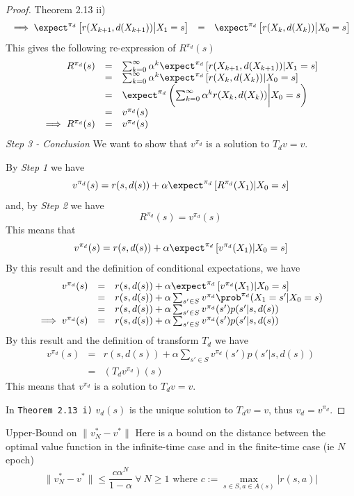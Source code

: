 \documentclass[11pt,a4paper]{article}
\begin{document}
\begin{proof}{Theorem 2.13 ii)}
\[\begin{array}{rcl}
      \implies\expect^{\pi_d}\left[r(X_{k+1},d(X_{k+1}))\big|X_1=s\right]&=&\expect^{\pi_d}\left[r(X_k,d(X_k))\big|X_0=s\right]
    \end{array}\]
    This gives the following re-expression of $R^{\pi_d}(s)$
    \[\begin{array}{rcl}
      R^{\pi_d}(s)&=&\sum_{k=0}^\infty\alpha^k\expect^{\pi_d}\left[r(X_{k+1},d(X_{k+1}))|X_1=s\right]\\
      &=&\sum_{k=0}^\infty\alpha^k\expect^{\pi_d}\left[r(X_k,d(X_k))|X_0=s\right]\\
      &=&\expect^{\pi_d}\left(\sum_{k=0}^\infty\alpha^kr(X_k,d(X_k))\bigg|X_0=s\right)\\
      &=&v^{\pi_d}(s)\\
      \implies R^{\pi_d}(s)&=&v^{\pi_d}(s)
    \end{array}\]
    \textit{Step 3 - Conclusion}
    We want to show that $v^{\pi_d}$ is a solution to $T_dv=v$.
    \par By \textit{Step 1} we have
    \[ v^{\pi_d}(s)=r(s,d(s))+\alpha\expect^{\pi_d}\left[R^{\pi_d}(X_1)|X_0=s\right] \]
    and, by \textit{Step 2} we have
    \[ R^{\pi_d}(s)=v^{\pi_d}(s) \]
    This means that
    \[ v^{\pi_d}(s)=r(s,d(s))+\alpha\expect^{\pi_d}\left[v^{\pi_d}(X_1)|X_0=s\right] \]
    By this result and the definition of conditional expectations, we have
    \[\begin{array}{rcl}
      v^{\pi_d}(s)&=&r(s,d(s))+\alpha\expect^{\pi_d}\left[v^{\pi_d}(X_1)|X_0=s\right]\\
      &=&r(s,d(s))+\alpha\sum_{s'\in S}v^{\pi_d}\prob^{\pi_d}(X_1=s'|X_0=s)\\
      &=&r(s,d(s))+\alpha\sum_{s'\in S}v^{\pi_d}(s')p(s'|s,d(s))\\
      \implies v^{\pi_d}(s)&=&r(s,d(s))+\alpha\sum_{s'\in S}v^{\pi_d}(s')p(s'|s,d(s))
    \end{array}\]
    By this result and the definition of transform $T_d$ we have
    \[\begin{array}{rcl}
      v^{\pi_d}(s)&=&r(s,d(s))+\alpha\sum_{s'\in S}v^{\pi_d}(s')p(s'|s,d(s))\\
      &=&(T_dv^{\pi_d})(s)
    \end{array}\]
    This means that $v^{\pi_d}$ is a solution to $T_dv=v$.
    \par In \texttt{Theorem 2.13 i)}  $v_d(s)$ is the unique solution to $T_dv=v$, thus $v_d=v^{\pi_d}$.
    \proved
  \end{proof}

  \begin{theorem}{Upper-Bound on $\|v_N^*-v^*\|$}
    Here is a bound on the distance between the optimal value function in the infinite-time case and in the finite-time case (ie $N$ epoch)
    \[ \|v_N^*-v^*\|\leq\frac{c\alpha^N}{1-\alpha}\ \forall\ N\geq1\text{ where }c:=\max_{s\in S,a\in A(s)}|r(s,a)| \]
  \end{theorem}
\end{document}
